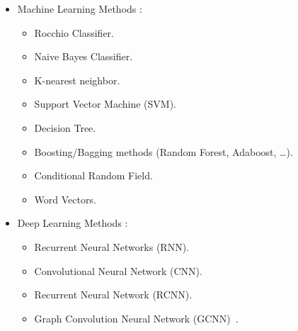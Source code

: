 \begin{itemize}
    \item Machine Learning Methods :
        \begin{itemize}
            \item Rocchio Classifier.
            \item Naive Bayes Classifier.
            \item K-nearest neighbor.
            \item Support Vector Machine (SVM).
            \item Decision Tree.
            \item Boosting/Bagging methods (Random Forest, Adaboost, …).
            \item Conditional Random Field.
            \item Word Vectors.
        \end{itemize}
    \item Deep Learning Methods :        
        \begin{itemize}
            \item Recurrent Neural Networks (RNN).
            \item Convolutional Neural Network (CNN).
            \item Recurrent Neural Network (RCNN).
            \item Graph Convolution Neural Network (GCNN)~\cite{paper-graph-convolution-network}.
        \end{itemize}
\end{itemize}


















